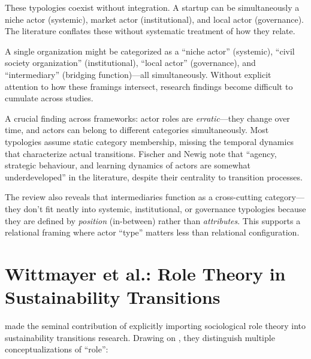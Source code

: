 \documentclass[../main.tex]{subfiles}
\begin{document}
These typologies coexist without integration. A startup can be simultaneously a niche actor (systemic), market actor (institutional), and local actor (governance). The literature conflates these without systematic treatment of how they relate.

\begin{insightbox}
A single organization might be categorized as a ``niche actor'' (systemic), ``civil society organization'' (institutional), ``local actor'' (governance), and ``intermediary'' (bridging function)---all simultaneously. Without explicit attention to how these framings intersect, research findings become difficult to cumulate across studies.
\end{insightbox}

A crucial finding across frameworks: actor roles are \textit{erratic}---they change over time, and actors can belong to different categories simultaneously. Most typologies assume static category membership, missing the temporal dynamics that characterize actual transitions. Fischer and Newig note that ``agency, strategic behaviour, and learning dynamics of actors are somewhat underdeveloped'' in the literature, despite their centrality to transition processes.

The review also reveals that intermediaries function as a cross-cutting category---they don't fit neatly into systemic, institutional, or governance typologies because they are defined by \textit{position} (in-between) rather than \textit{attributes}. This supports a relational framing where actor ``type'' matters less than relational configuration.


\section{Wittmayer et al.: Role Theory in Sustainability Transitions}

\textcite{wittmayer2017roles} made the seminal contribution of explicitly importing sociological role theory into sustainability transitions research. Drawing on \textcite{biddle1986role}, they distinguish multiple conceptualizations of ``role'':
\end{document}
